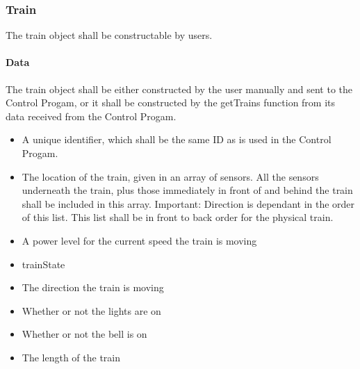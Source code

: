 \documentclass[a4paper,11pt,notitlepage]{article}
\def\CS{Control Progam\xspace}
\begin{document}
\subsubsection{Train}
The train object shall be constructable by users.
\paragraph{Data}
The train object shall be either constructed by the user manually and sent to the \CS, or it shall be constructed by the getTrains function from its data received from the \CS.
\begin{itemize}
\item A unique identifier, which shall be the same ID as is used in the \CS.
\item The location of the train, given in an array of sensors. All the sensors underneath the train, plus those immediately in front of and behind the train shall be included in this array. Important: Direction is dependant in the order of this list. This list shall be in front to back order for the physical train.
\item A power level for the current speed the train is moving
\item trainState
\item The direction the train is moving
\item Whether or not the lights are on
\item Whether or not the bell is on
\item The length of the train
\end{itemize}
\end{document}
